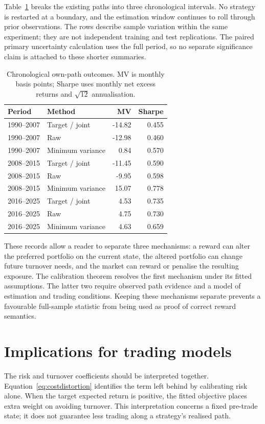 \documentclass[sigconf,anonymous,review]{acmart}
\begin{document}
Table~\ref{tab:periods} breaks the existing paths into three chronological intervals. No strategy is restarted at a boundary, and the estimation window continues to roll through prior observations. The rows describe sample variation within the same experiment; they are not independent training and test replications. The paired primary uncertainty calculation uses the full period, so no separate significance claim is attached to these shorter summaries.
\begin{table}[ht]
\centering\small
\caption{Chronological own-path outcomes. MV is monthly basis points; Sharpe uses monthly net excess returns and $\sqrt{12}$ annualisation.}
\label{tab:periods}
\begin{tabular}{llrr}\toprule
Period & Method & MV & Sharpe\\\midrule
1990--2007 & Target / joint & -14.82 & 0.455 \\
1990--2007 & Raw & -12.98 & 0.460 \\
1990--2007 & Minimum variance & 0.84 & 0.570 \\
2008--2015 & Target / joint & -11.45 & 0.590 \\
2008--2015 & Raw & -9.95 & 0.598 \\
2008--2015 & Minimum variance & 15.07 & 0.778 \\
2016--2025 & Target / joint & 4.53 & 0.735 \\
2016--2025 & Raw & 4.75 & 0.730 \\
2016--2025 & Minimum variance & 4.63 & 0.659 \\
\bottomrule\end{tabular}
\end{table}
These records allow a reader to separate three mechanisms: a reward can alter the preferred portfolio on the current state, the altered portfolio can change future turnover needs, and the market can reward or penalise the resulting exposure. The calibration theorem resolves the first mechanism under its fitted assumptions. The latter two require observed path evidence and a model of estimation and trading conditions. Keeping these mechanisms separate prevents a favourable full-sample statistic from being used as proof of correct reward semantics.

\section{Implications for trading models}
The risk and turnover coefficients should be interpreted together. Equation~\eqref{eq:costdistortion} identifies the term left behind by calibrating risk alone. When the target expected return is positive, the fitted objective places extra weight on avoiding turnover. This interpretation concerns a fixed pre-trade state; it does not guarantee less trading along a strategy's realised path.
\end{document}

